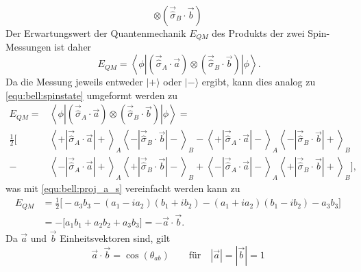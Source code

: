 \begin{refsection}
\begin{equation}
        \otimes \left( \vec{\hat{\sigma}}_B \cdot \vec{b} \right)
\end{equation}
Der Erwartungswert der Quantenmechanik $E_{QM}$ des Produkts der zwei 
Spin-Messungen ist daher
\begin{equation}\
    E_{QM} = \left\langle \phi \left| 
    \left( \vec{\hat{\sigma}}_A \cdot \vec{a} \right)
            \otimes \left( \vec{\hat{\sigma}}_B \cdot \vec{b} \right)
    \right| \phi \right\rangle.
\end{equation}
Da die Messung jeweils entweder $|+\rangle$ oder $|-\rangle$ ergibt, kann
dies analog zu \eqref{equ:bell:spinstate} umgeformt werden zu
\begin{equation} 
\begin{split}
   E_{QM }=&\left\langle \phi \left| 
       \left( \vec{\hat{\sigma}}_A \cdot \vec{a} \right)
               \otimes \left( \vec{\hat{\sigma}}_B \cdot \vec{b} \right)
       \right| \phi \right\rangle
    = \\
    \frac{1}{2}\Bigg[ &
        \left\langle{+}\left| \vec{\hat{\sigma}}_A \cdot \vec{a} \right|{+}\right\rangle_A
        \left\langle{-}\left| \vec{\hat{\sigma}}_B \cdot \vec{b} \right|{-}\right\rangle_B
        -
        \left\langle{+}\left| \vec{\hat{\sigma}}_A \cdot \vec{a} \right|{-}\right\rangle_A
        \left\langle{-}\left| \vec{\hat{\sigma}}_B \cdot \vec{b} \right|{+}\right\rangle_B \\
        - &
        \left\langle{-}\left| \vec{\hat{\sigma}}_A \cdot \vec{a} \right|{+}\right\rangle_A
        \left\langle{+}\left| \vec{\hat{\sigma}}_B \cdot \vec{b} \right|{-}\right\rangle_B
        +
        \left\langle{-}\left| \vec{\hat{\sigma}}_A \cdot \vec{a} \right|{-}\right\rangle_A
        \left\langle{+}\left| \vec{\hat{\sigma}}_B \cdot \vec{b} \right|{+}\right\rangle_B
    \Bigg],
\end{split}
\end{equation}
was mit \eqref{equ:bell:proj_a_s} vereinfacht werden kann zu
\begin{equation}\label{equ:bell:e_qm}
\begin{split}
    E_{QM} &= \frac{1}{2} \big[ -a_3b_3 - (a_1-ia_2)(b_1+ib_2) - (a_1+ia_2)(b_1-ib_2) - a_3b_3 \big] \\
    &= -\big[ a_1b_1 + a_2b_2 + a_3b_3 \big] = -\vec{a} \cdot \vec{b}.
\end{split}
\end{equation}
Da $\vec{a}$ und $\vec{b}$ Einheitsvektoren sind, gilt
\begin{equation}
    \vec{a} \cdot \vec{b} = \cos(\theta_{ab}) \qquad \text{f\"ur} \quad |\vec{a}| = |\vec{b}| = 1

\end{equation}
\end{refsection}
